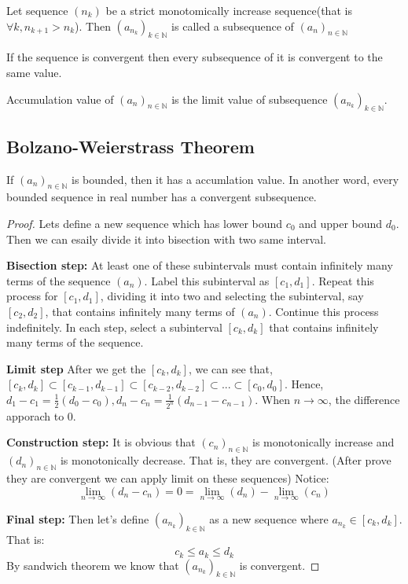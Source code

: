 \documentclass{article}
\newcommand{\N}{\mathbb{N}}
\begin{document}
\begin{definition}
	Let sequence $(n_k)$ be a strict monotomically increase sequence(that is $\forall k, n_{k+1}>n_k$). Then $(a_{n_k})_{k\in \N}$ is called a subsequence of $(a_n)_{n\in \N}$
\end{definition}

If the sequence is convergent then every subsequence of it is convergent to the same value.

\begin{definition}
	Accumulation value of $(a_n)_{n\in \N}$ is the limit value of subsequence $(a_{n_k})_{k\in \N}$.
\end{definition}

\subsection{Bolzano-Weierstrass Theorem}
\begin{theorem}
	If $(a_n)_{n\in \N}$ is bounded, then it has a accumlation value. In another word, every bounded sequence in real number has a convergent subsequence.
\end{theorem}

\begin{proof}
	Lets define a new sequence which has lower bound $c_0$ and upper bound $d_0$. Then we can esaily divide it into bisection with two same interval. 
	
\textbf{Bisection step:}	At least one of these subintervals must contain infinitely many terms of the sequence \((a_n)\). Label this subinterval as \([c_1, d_1]\). Repeat this process for \([c_1, d_1]\), dividing it into two and selecting the subinterval, say \([c_2, d_2]\), that contains infinitely many terms of \((a_n)\). Continue this process indefinitely. In each step, select a subinterval \([c_k, d_k]\) that contains infinitely many terms of the sequence. 

\textbf{Limit step} After we get the $[c_k,d_k]$, we can see that, $[c_k, d_k]\subset [c_{k-1}, d_{k-1}]\subset [c_{k-2}, d_{k-2}]\subset ...\subset [c_0, d_0]$. Hence, $d_1-c_1=\frac{1}{2}(d_0-c_0),d_n-c_n=\frac{1}{2^n}(d_{n-1}-c_{n-1})$. When $n\to \infty$, the difference apporach to 0. 

\textbf{Construction step:} It is obvious that $(c_n)_{n\in \mathbb{N}}$ is monotonically increase and $(d_n)_{n\in \mathbb{N}}$ is monotonically decrease. That is, they are convergent. (After prove they are convergent we can apply limit on these sequences) Notice:
\begin{equation*}
	\lim_{n\to \infty}(d_n-c_n)=0=\lim_{n\to \infty}(d_n)-\lim_{n\to \infty}(c_n)
\end{equation*}

\textbf{Final step:} Then let's define $(a_{n_k})_{k\in \mathbb{N}}$ as a new sequence where $a_{n_k}\in [c_k,d_k]$. That is:
\begin{equation*}
	c_k\leq a_k\leq d_k
\end{equation*}
By sandwich theorem we know that $(a_{n_k})_{k\in \mathbb{N}}$ is convergent.

\end{proof}
\end{document}
